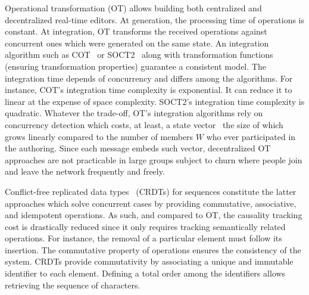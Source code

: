 \begin{asparadesc}
\item [Operational transformation] (OT) allows building both centralized and
  decentralized real-time editors. At generation, the processing time of
  operations is constant. At integration, OT transforms the received operations
  against concurrent ones which were generated on the same state. An integration
  algorithm such as COT~\cite{sun2009contextbased} or
  SOCT2~\cite{vidot2000copies} along with transformation functions (ensuring
  transformation properties) guarantee a consistent model. The integration time
  depends of concurrency and differs among the algorithms.  For instance, COT's
  integration time complexity is exponential. It can reduce it to linear at the
  expense of space complexity. SOCT2's integration time complexity is quadratic.
  Whatever the trade-off, OT's integration algorithms rely on concurrency
  detection which costs, at least, a state
  vector~\cite{charronbost1991concerning} the size of which grows linearly
  compared to the number of members $W$ who ever participated in the
  authoring. Since each message embeds such vector, decentralized OT approaches
  are not practicable in large groups subject to churn where people join and
  leave the network frequently and freely. %

\item [Conflict-free replicated data types~\cite{shapiro2011comprehensive,
    shapiro2011conflict}] (CRDTs) for sequences constitute the latter approaches
  which solve concurrent cases by providing commutative, associative, and
  idempotent operations. As such, and compared to OT, the causality tracking
  cost is drastically reduced since it only requires tracking semantically
  related operations. For instance, the removal of a particular element must
  follow its insertion. The commutative property of operations ensures the
  consistency of the system. CRDTs provide commutativity by associating a unique
  and immutable identifier to each element. Defining a total order among the
  identifiers allows retrieving the sequence of characters.


\end{asparadesc}
